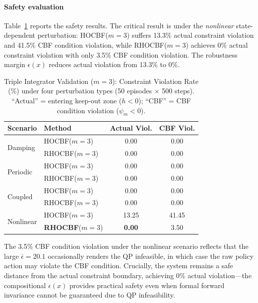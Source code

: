 \paragraph{Safety evaluation} Table~\ref{tab:m3_validation} reports the safety results. The critical result is under the \emph{nonlinear} state-dependent perturbation: HOCBF($m{=}3$) suffers 13.3\% actual constraint violation and 41.5\% CBF condition violation, while RHOCBF($m{=}3$) achieves 0\% actual constraint violation with only 3.5\% CBF condition violation. The robustness margin $\epsilon(x)$ reduces actual violation from 13.3\% to 0\%.

\begin{table}[htbp]
    \centering
    \caption{Triple Integrator Validation ($m = 3$): Constraint Violation Rate (\%) under four perturbation types (50 episodes $\times$ 500 steps). ``Actual'' = entering keep-out zone ($h < 0$); ``CBF'' = CBF condition violation ($\psi_m < 0$).}
    \label{tab:m3_validation}
    \begin{tabular}{llcc}
        \toprule
        Scenario & Method & Actual Viol. & CBF Viol. \\
        \midrule
        \multirow{2}{*}{Damping} & HOCBF($m{=}3$) & 0.00 & 0.00 \\
                                  & RHOCBF($m{=}3$) & 0.00 & 0.00 \\
        \midrule
        \multirow{2}{*}{Periodic} & HOCBF($m{=}3$) & 0.00 & 0.00 \\
                                   & RHOCBF($m{=}3$) & 0.00 & 0.00 \\
        \midrule
        \multirow{2}{*}{Coupled} & HOCBF($m{=}3$) & 0.00 & 0.00 \\
                                  & RHOCBF($m{=}3$) & 0.00 & 0.00 \\
        \midrule
        \multirow{2}{*}{Nonlinear} & HOCBF($m{=}3$) & 13.25 & 41.45 \\
                                    & \textbf{RHOCBF}($m{=}3$) & \textbf{0.00} & 3.50 \\
        \bottomrule
    \end{tabular}
\end{table}

The 3.5\% CBF condition violation under the nonlinear scenario reflects that the large $\bar{\epsilon} = 20.1$ occasionally renders the QP infeasible, in which case the raw policy action may violate the CBF condition. Crucially, the system remains a safe distance from the actual constraint boundary, achieving 0\% actual violation---the compositional $\epsilon(x)$ provides practical safety even when formal forward invariance cannot be guaranteed due to QP infeasibility.

